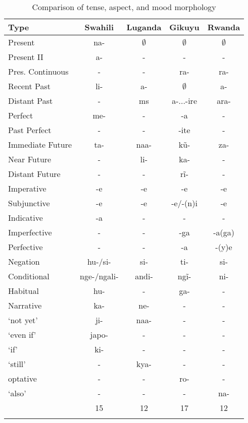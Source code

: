 \documentclass[output=paper,
modfonts
]{langscibook}
\begin{document}
\newpage 
\begin{table} 
\caption{Comparison of tense, aspect, and mood morphology}

\label{tab:jerro:6} 
\begin{tabular}{lcccc} 
\lsptoprule
 \textbf{ Type} & \textbf{ Swahili}  & \textbf{ Luganda}  & \textbf{ Gikuyu} & \textbf{ Rwanda}  \\
\midrule
  Present				& na-		& 	$\emptyset$		& $\emptyset$ 			&  $\emptyset$\\
  Present II			& a-		& 	-			 	& - 						& - \\
  Pres. Continuous	& -		& -					& ra-					& ra- \\
  Recent Past			& li-		& 	a-				& $\emptyset$			& a-	\\
  Distant Past		& -			& {\sc ms} 			& a-...-ire					& ara-\\
  Perfect				& me-		& -					& -a					& -\\
  Past Perfect		& -			& -					& -ite					& -\\
  Immediate Future 		& ta-		& naa-				& k\~u-					& za- \\
  Near Future		& -			& li-				& ka-					& - \\
  Distant Future		& -			& -					& r\~i-					& - \\
 
 \midrule
 
  Imperative			& -e		& -e				& -e    				& -e\\
  Subjunctive			& -e		& -e				& -e/-(n)i				& -e\\
  Indicative	& -a		& -	& 	-	& 	- \\
 
 \midrule
 
  Imperfective		& -	 		& -					& -ga					& -a(ga)\\
  Perfective			& -			& -					& -a					& -(y)e\\
 
 \midrule
 
  Negation 			& hu-/si- 	& si-					& ti- 					& si-\\
 \midrule
   Conditional			& nge-/ngali-	& andi-			& ng\~i-				& ni-  \\
  Habitual 			& hu-			& -				& ga-					& -\\
  Narrative			& ka-			& ne-			& -						& -  \\
  `not yet'			& ji-		& naa-				& -						& - \\
  `even if'			& japo-		& -					& -						& -	\\
  `if'				& ki-		& -					& - 						& -  \\
 `still'				& -			& kya-				& - 						& - \\
 	optative				& -			& -					& ro-					& - \\
 `also'				& -			& -					& -						& na-\\
 
 \midrule

		&  15 & 12 	& 17 & 12 	\\
\lspbottomrule
 \end{tabular}
\end{table}
 
\end{document}
